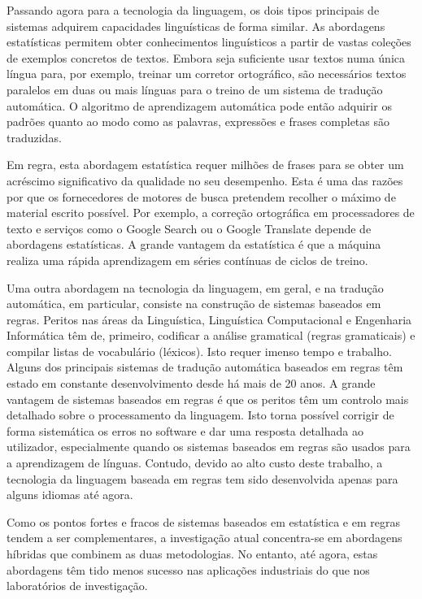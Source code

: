 \begin{multicols}{2}

Passando agora para a tecnologia da linguagem, os dois tipos principais de sistemas adquirem capacidades linguísticas de forma similar. As abordagens estatísticas permitem obter conhecimentos linguísticos a partir de vastas coleções de exemplos concretos de textos. Embora seja suficiente usar textos numa única língua para, por exemplo, treinar um corretor ortográfico, são necessários textos paralelos em duas ou mais línguas para o treino de um sistema de tradução automática. O algoritmo de aprendizagem automática pode então adquirir os padrões quanto ao modo como as palavras, expressões e frases completas são traduzidas.

Em regra, esta abordagem estatística requer milhões de frases para se obter um acréscimo significativo da qualidade no seu desempenho. 
Esta é uma das razões por que os fornecedores de motores de busca pretendem recolher o máximo de material escrito possível. Por exemplo, a correção ortográfica em processadores de texto e serviços como o Google Search ou o Google Translate depende de abordagens estatísticas. A grande vantagem da estatística é que a máquina realiza uma rápida aprendizagem em séries contínuas de ciclos de treino.

Uma outra abordagem na tecnologia da linguagem, em geral, e na tradução automática, em particular, consiste na construção de sistemas baseados em regras. Peritos nas áreas da Linguística, Linguística Computacional e Engenharia Informática têm de, primeiro, codificar a análise gramatical (regras gramaticais) e compilar listas de vocabulário (léxicos). Isto requer imenso tempo e trabalho. Alguns dos principais sistemas de tradução automática baseados em regras têm estado em constante desenvolvimento desde há mais de 20 anos. A grande vantagem de sistemas baseados em regras é que os peritos têm um controlo mais detalhado sobre o processamento da linguagem. Isto torna possível corrigir de forma sistemática os erros no software e dar uma resposta detalhada ao utilizador, especialmente quando os sistemas baseados em regras são usados para a aprendizagem de línguas. Contudo, devido ao alto custo deste trabalho, a tecnologia da linguagem baseada em regras tem sido desenvolvida apenas para alguns idiomas até agora.

Como os pontos fortes e fracos de sistemas baseados em estatística e em regras tendem a ser complementares, a investigação atual concentra-se em abordagens híbridas que combinem as duas metodologias. No entanto, até agora, estas abordagens têm tido menos sucesso nas aplicações industriais do que nos laboratórios de investigação. 


\end{multicols}
